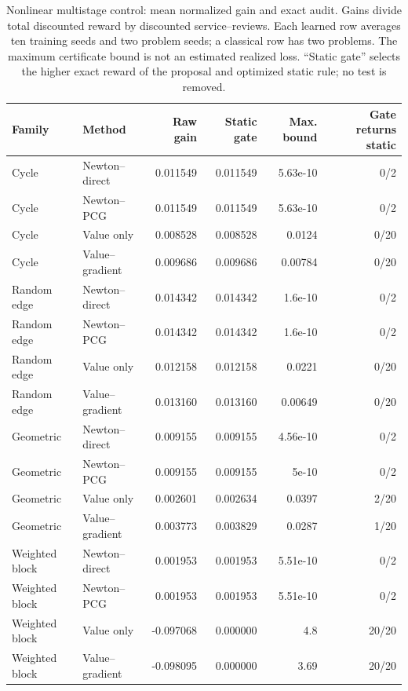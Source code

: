 \begin{table}[p]
\centering\small
\caption{Nonlinear multistage control: mean normalized gain and exact audit. Gains divide total discounted reward by discounted service--reviews. Each learned row averages ten training seeds and two problem seeds; a classical row has two problems. The maximum certificate bound is not an estimated realized loss. ``Static gate'' selects the higher exact reward of the proposal and optimized static rule; no test is removed.}
\label{tab:r10-quality}
\begin{tabular}{llrrrr}\toprule
Family & Method & Raw gain & Static gate & Max. bound & Gate returns static\\\midrule
Cycle & Newton--direct & 0.011549 & 0.011549 & 5.63e-10 & 0/2 \\
Cycle & Newton--PCG & 0.011549 & 0.011549 & 5.63e-10 & 0/2 \\
Cycle & Value only & 0.008528 & 0.008528 & 0.0124 & 0/20 \\
Cycle & Value--gradient & 0.009686 & 0.009686 & 0.00784 & 0/20 \\
Random edge & Newton--direct & 0.014342 & 0.014342 & 1.6e-10 & 0/2 \\
Random edge & Newton--PCG & 0.014342 & 0.014342 & 1.6e-10 & 0/2 \\
Random edge & Value only & 0.012158 & 0.012158 & 0.0221 & 0/20 \\
Random edge & Value--gradient & 0.013160 & 0.013160 & 0.00649 & 0/20 \\
Geometric & Newton--direct & 0.009155 & 0.009155 & 4.56e-10 & 0/2 \\
Geometric & Newton--PCG & 0.009155 & 0.009155 & 5e-10 & 0/2 \\
Geometric & Value only & 0.002601 & 0.002634 & 0.0397 & 2/20 \\
Geometric & Value--gradient & 0.003773 & 0.003829 & 0.0287 & 1/20 \\
Weighted block & Newton--direct & 0.001953 & 0.001953 & 5.51e-10 & 0/2 \\
Weighted block & Newton--PCG & 0.001953 & 0.001953 & 5.51e-10 & 0/2 \\
Weighted block & Value only & -0.097068 & 0.000000 & 4.8 & 20/20 \\
Weighted block & Value--gradient & -0.098095 & 0.000000 & 3.69 & 20/20 \\
\bottomrule\end{tabular}
\end{table}
